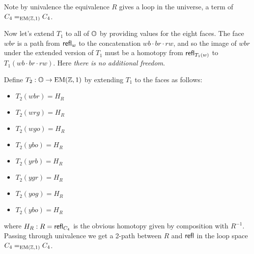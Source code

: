 Note by univalence the equivalence \( R \) gives a loop in the universe, a term of \( C_4=_{\mathrm{EM}(\mathbb{Z},1)}C_4 \).

Now let's extend \( T_1 \) to all of \( \mathbb{O} \) by providing values for the eight faces. The face \( wbr \) is a path from \( \mathsf{refl}_w \) to the concatenation \( wb\cdot br\cdot rw \), and so the image of \( wbr \) under the extended version of \( T_1 \) must be a homotopy from \( \mathsf{refl}_{T_1(w)} \) to \( T_1(wb\cdot br\cdot rw) \). Here \emph{there is no additional freedom}.

\begin{mydef}
\label{def:octahedron_curvature}
Define \( T_2:\mathbb{O}\to\mathrm{EM}(\mathbb{Z},1) \) by extending \( T_1 \) to the faces as follows:
\begin{multicols}{2}
\begin{itemize}
\item \( T_2(wbr)=H_R \) 
\item \( T_2(wrg)=H_R \)
\item \( T_2(wgo)=H_R \)
\item \( T_2(ybo)=H_R \)
\item \( T_2(yrb)=H_R \) 
\item \( T_2(ygr)=H_R \)
\item \( T_2(yog)=H_R \)
\item \( T_2(ybo)=H_R \)
\end{itemize}
\end{multicols}
where \( H_R:R=\mathsf{refl}_{C_4} \) is the obvious homotopy given by composition with \( R^{-1} \). Passing through univalence we get a 2-path between \( R \) and \( \mathsf{refl} \) in the loop space \( C_4=_{\mathrm{EM}(\mathbb{Z},1)}C_4 \).
\end{mydef}

